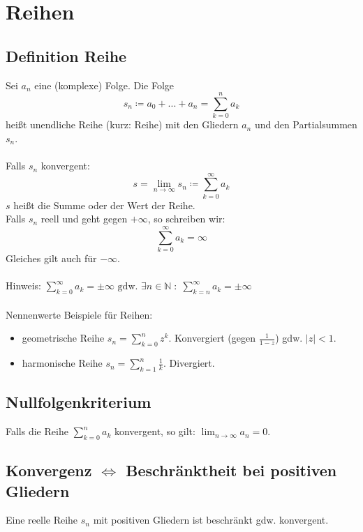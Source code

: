 \documentclass[halfparscip]{scrartcl}
\newcounter{subsection2}
\begin{document}
\newpage
\section{Reihen}
\subsection{Definition Reihe}
Sei $a_n$ eine (komplexe) Folge. Die Folge 
\begin{equation*}
	s_n \coloneqq a_0 + ... + a_n = \sum_{k=0}^{n}a_k
\end{equation*}
heißt unendliche Reihe (kurz: Reihe) mit den Gliedern $a_n$ und den Partialsummen $s_n$.\\\\
Falls $s_n$ konvergent:
\begin{equation*}
	s = \lim_{n \rightarrow \infty} s_n \coloneqq \sum_{k=0}^{\infty}a_k
\end{equation*}
$s$ heißt die Summe oder der Wert der Reihe.\\
Falls $s_n$ reell und geht gegen $+\infty$, so schreiben wir:
\begin{equation*}
	\sum_{k=0}^\infty a_k = \infty
\end{equation*}
Gleiches gilt auch für $-\infty$.\\\\
Hinweis: $\sum\limits_{k=0}^\infty a_k = \pm \infty \text{ gdw. } \exists n \in \mathbb{N} \;:\;\sum\limits_{k=n}^\infty a_k = \pm \infty$\\\\
Nennenwerte Beispiele für Reihen:
\begin{itemize}
	\item geometrische Reihe $s_n = \sum\limits_{k=0}^{n}z^k$. Konvergiert (gegen $\frac{1}{1-z}$) gdw. $|z| < 1$.
	\item harmonische Reihe $s_n = \sum\limits_{k=1}^{n}\frac{1}{k}$. Divergiert.
\end{itemize}

\subsection{Nullfolgenkriterium}
Falls die Reihe $\sum_{k=0}^{n}a_k$ konvergent, so gilt: $\lim_{n \rightarrow \infty} a_n = 0$.

\subsection{Konvergenz $\Leftrightarrow$ Beschränktheit bei positiven Gliedern}
Eine reelle Reihe $s_n$ mit positiven Gliedern ist beschränkt gdw. konvergent.
\end{document}
